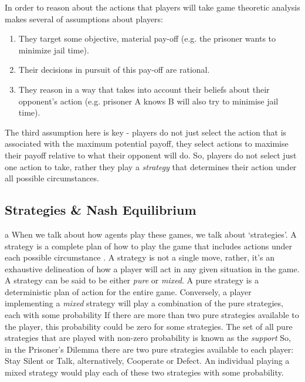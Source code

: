 \documentclass[11pt]{book}
\newcommand*{\np}{\par\noindent\newline}
\begin{document}
\np In order to reason about the actions that players will take game theoretic
analysis makes several of assumptions about players:
\begin{enumerate}
    \item They target some objective, material pay-off (e.g. the prisoner wants
    to minimize jail time).
    \item Their decisions in pursuit of this pay-off are rational.
    \item They reason in a way that takes into account their beliefs about
    their opponent's action (e.g. prisoner A knows B will also try to minimise
    jail time). 
\end{enumerate}
\cite{osborne_course_1994}
\np The third assumption here is key - players do not just select the action
that is associated with the maximum potential payoff, they select actions to
maximise their payoff relative to what their opponent will do. So, players do
not select just one action to take, rather they play a \textit{strategy} that
determines their action under all possible circumstances.

\subsection{Strategies \& Nash Equilibrium}\label{strategies_nash}a
When we talk about how agents play these games, we talk about `strategies'.
A strategy is a complete plan of how to play the game that includes actions under each possible circumstance \citep{angner_course_2012}.
A strategy is not a single move, rather, it's an exhaustive delineation of how a player will act in any given situation in the game. 
A strategy can be said to be either \textit{pure} or \textit{mixed}.
A pure strategy is a deterministic plan of action for the entire game.
Conversely, a player implementing a \textit{mixed} strategy will play a combination of the pure strategies, each with some probability
If there are more than two pure strategies available to the player, this probability could be zero for some strategies.
The set of all pure strategies that are played with non-zero probability is known as the \textit{support} \citep[~p. 102]{shoham_multiagent_2008}
So, in the Prisoner's Dilemma there are two pure strategies available to each player: Stay Silent or Talk, alternatively, Cooperate or Defect.
An individual playing a mixed strategy would play each of these two strategies with some probability.
\end{document}
